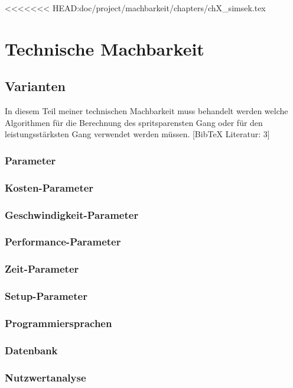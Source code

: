 <<<<<<< HEAD:doc/project/machbarkeit/chapters/chX_simsek.tex
\chapter {Technische Machbarkeit}
\section {Varianten}
In diesem Teil meiner technischen Machbarkeit muss behandelt werden welche Algorithmen für die Berechnung des spritsparensten Gang oder für den leistungsstärksten Gang verwendet werden müssen.
[BibTeX Literatur: 3]
\subsection {Parameter}

\subsection {Kosten-Parameter}

\subsection {Geschwindigkeit-Parameter}

\subsection {Performance-Parameter}

\subsection {Zeit-Parameter}

\subsection {Setup-Parameter}

\subsection {Programmiersprachen}
\subsection {Datenbank}
\subsection {Nutzwertanalyse}
